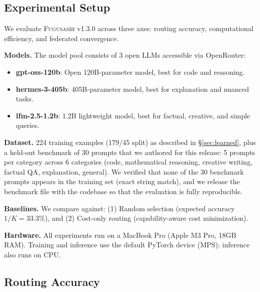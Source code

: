 \documentclass[11pt,a4paper]{article}
\newcommand{\fugusashi}{\textsc{Fugusashi}}
\begin{document}
\subsection{Experimental Setup}

We evaluate \fugusashi{} v1.3.0 across three axes: routing accuracy, computational efficiency, and federated convergence.

\textbf{Models.}
The model pool consists of 3 open LLMs accessible via OpenRouter:
\begin{itemize}[leftmargin=*]
    \item \textbf{gpt-oss-120b}: Open 120B-parameter model, best for code and reasoning.
    \item \textbf{hermes-3-405b}: 405B-parameter model, best for explanation and nuanced tasks.
    \item \textbf{lfm-2.5-1.2b}: 1.2B lightweight model, best for factual, creative, and simple queries.
\end{itemize}

\textbf{Dataset.}
224 training examples (179/45 split) as described in \S\ref{sec:learned}, plus a held-out benchmark of 30 prompts that we authored for this release: 5 prompts per category across 6 categories (code, mathematical reasoning, creative writing, factual QA, explanation, general).
We verified that none of the 30 benchmark prompts appears in the training set (exact string match), and we release the benchmark file with the codebase so that the evaluation is fully reproducible.

\textbf{Baselines.}
We compare against: (1) Random selection (expected accuracy $1/K = 33.3\%$), and (2) Cost-only routing (capability-aware cost minimization).

\textbf{Hardware.}
All experiments run on a MacBook Pro (Apple M3 Pro, 18GB RAM). Training and inference use the default PyTorch device (MPS); inference also runs on CPU.

\subsection{Routing Accuracy}
\end{document}
